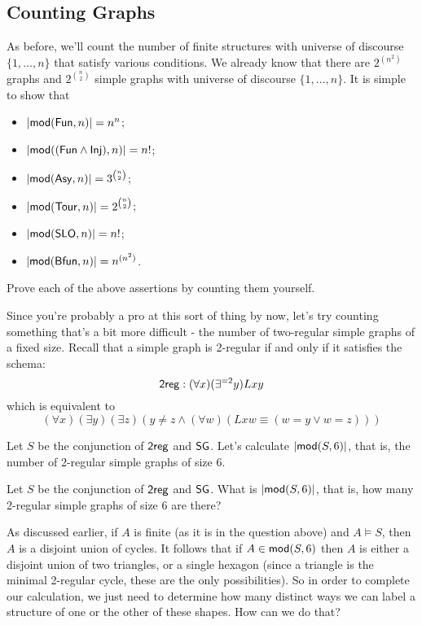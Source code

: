 \subsection*{Counting Graphs}
As before, we'll count the number of finite structures with universe of discourse $\{1,\ldots,n\}$ that satisfy various conditions. We already know that there are $2^{(n^2)}$ graphs and $2^{\binom{n}{2}}$ simple graphs with universe of discourse $\{1,\ldots,n\}$. It is simple to show that
\begin{itemize}
\item
$\mbox{$|\mbox{$\mathsf{mod}(\mbox{$\mathsf{Fun}$},n)$}|$}= n^n$;
\item
$\mbox{$|\mbox{$\mathsf{mod}((\mbox{$\mathsf{Fun}$}\wedge\mbox{$\mathsf{Inj}$}),n)$}|$}= n!$;
\item
$\mbox{$|\mbox{$\mathsf{mod}(\mbox{$\mathsf{Asy}$},n)$}|$}= 3^{\binom{n}{2}}$;
\item
$\mbox{$|\mbox{$\mathsf{mod}(\mbox{$\mathsf{Tour}$},n)$}|$}= 2^{\binom{n}{2}}$;
\item
$\mbox{$|\mbox{$\mathsf{mod}(\mbox{$\mathsf{SLO}$},n)$}|$}= n!$;
\item
$\mbox{$|\mbox{$\mathsf{mod}(\mbox{$\mathsf{Bfun}$},n)$}|$}= n^{(n^2)}$.
\end{itemize}

\begin{aside}
    Prove each of the above assertions by counting them yourself. 
\end{aside}

Since you're probably a pro at this sort of thing by now, let's try counting something that's a bit more difficult - the number of two-regular simple graphs of a fixed size. Recall that a simple graph is 2-regular if and only if it satisfies the schema:
\[
    \mbox{$\mathsf{2reg}$}: (\forall x)(\exists^{=2}y)Lxy
\]
which is equivalent to 
\[
    (\forall x)(\exists y)(\exists z)(y\neq z\wedge(\forall w)(Lxw\equiv(w=y\vee w=z)))
\]

Let $S$ be the conjunction of $\mbox{$\mathsf{2reg}$}$ and $\mbox{$\mathsf{SG}$}$. Let's calculate $\mbox{$|\mbox{$\mathsf{mod}(S,6)$}|$}$, that is, the number of 2-regular simple graphs of size 6. 

\begin{example}\label{hexagon-example}
Let $S$ be the conjunction of $\mbox{$\mathsf{2reg}$}$ and $\mbox{$\mathsf{SG}$}$. What is $\mbox{$|\mbox{$\mathsf{mod}(S,6)$}|$}$, that is, how many 2-regular simple graphs of size 6 are there? 
\end{example}

As discussed earlier, if $A$ is finite (as it is in the question above) and $A \models S$, then $A$ is a disjoint union of cycles. It follows that if $A \in \mbox{$\mathsf{mod}(S,6)$}$ then $A$ is either a disjoint union of two triangles, or a single hexagon (since a triangle is the minimal 2-regular cycle, these are the only possibilities). So in order to complete our calculation, we just need to determine how many distinct ways we can label a structure of one or the other of these shapes. How can we do that?

